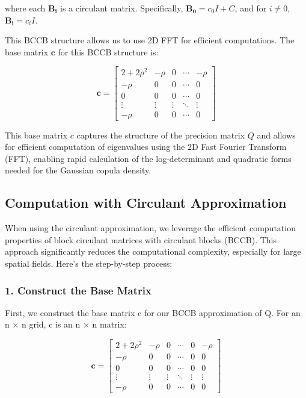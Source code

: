 \documentclass[journal=,manuscript=]{achemso}
\begin{document}
where each \(\mathbf{B_i}\) is a circulant matrix. Specifically,
\(\mathbf{B_0} = c_0I + C\), and for \(i \neq 0\),
\(\mathbf{B_i} = c_iI\).

This BCCB structure allows us to use 2D FFT for efficient computations.
The base matrix \(\mathbf c\) for this BCCB structure is:

\[
\mathbf{c} = \begin{bmatrix}
2+2\rho^2 & -\rho & 0 & \cdots  & -\rho \\
-\rho & 0 & 0 & \cdots  & 0 \\
0 & 0 & 0 & \cdots  & 0 \\
\vdots & \vdots & \vdots & \ddots &  \vdots \\
-\rho & 0 & 0 & \cdots  & 0
\end{bmatrix}
\]

This base matrix \(c\) captures the structure of the precision matrix
\(Q\) and allows for efficient computation of eigenvalues using the 2D
Fast Fourier Transform (FFT), enabling rapid calculation of the
log-determinant and quadratic forms needed for the Gaussian copula
density.

\subsection{Computation with Circulant
Approximation}\label{computation-with-circulant-approximation}

When using the circulant approximation, we leverage the efficient
computation properties of block circulant matrices with circulant blocks
(BCCB). This approach significantly reduces the computational
complexity, especially for large spatial fields. Here's the step-by-step
process:

\subsubsection{1. Construct the Base
Matrix}\label{construct-the-base-matrix}

First, we construct the base matrix c for our BCCB approximation of Q.
For an n × n grid, c is an n × n matrix:

\[
\mathbf{c} = \begin{bmatrix}
2+2\rho^2 & -\rho & 0 & \cdots & 0 & -\rho \\
-\rho & 0 & 0 & \cdots & 0 & 0 \\
0 & 0 & 0 & \cdots & 0 & 0 \\
\vdots & \vdots & \vdots & \ddots & \vdots & \vdots \\
-\rho & 0 & 0 & \cdots & 0 & 0
\end{bmatrix}
\]
\end{document}
